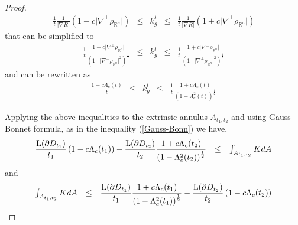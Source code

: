 \documentclass[a4paper]{amsart}
\theoremstyle{definition}
\numberwithin{equation}{section}
\begin{document}
\begin{proof}
\begin{equation}\begin{array}{lllll}
\displaystyle\frac{1}{t}\displaystyle\frac{1}{\vert \nabla R\vert}\left(1-c\vert \nabla^\perp {{\rho_{{\mathbb{R}}^n}}}\vert\right)&\leq & k_g^t&\leq& \displaystyle\frac{1}{t}\displaystyle\frac{1}{\vert \nabla R\vert}\left(1+c\vert \nabla^\perp {{\rho_{{\mathbb{R}}^n}}}\vert \right) \nonumber 
\end{array}
\end{equation}that can be simplified to
\begin{equation}\begin{array}{lllll}
\displaystyle\frac{1}{t}\displaystyle\frac{1-c\vert \nabla^\perp {{\rho_{{\mathbb{R}}^n}}}\vert}{\left(1-\vert \nabla^\perp {{\rho_{{\mathbb{R}}^n}}}\vert^2\right)^{\frac{1}{2}}}&\leq & k_g^t&\leq& \displaystyle\frac{1}{t}\displaystyle\frac{1+c\vert \nabla^\perp {{\rho_{{\mathbb{R}}^n}}}\vert}{\left(1-\vert \nabla^\perp {{\rho_{{\mathbb{R}}^n}}}\vert^2\right)^{\frac{1}{2}}}\nonumber
\end{array}
\end{equation}and can be rewritten as
\begin{equation}\label{eq3.8}
\begin{array}{lllll}
\displaystyle\frac{1-c\Lambda_c(t)}{t}&\leq & k_g^t & \leq &\displaystyle \frac{1}{t}\displaystyle\frac{1+c\Lambda_c(t)}{\left(1-\Lambda^2_c(t)\right)^{\frac{1}{2}}}
\end{array}
\end{equation}

Applying the above inequalities to the extrinsic annulus $A_{t_1,t_2}$ and using Gauss-Bonnet formula, as in the inequality (\ref{Gauss-Bonn}) we have,
\begin{equation}\label{eq3.9}\begin{array}{lll}\displaystyle\frac{{\rm L}(\partial D_{t_1})}{t_1}\displaystyle\left(1-c\Lambda_c(t_1)\right)-\displaystyle\frac{{\rm L}(\partial D_{t_2})}{t_2}\frac{1+c\Lambda_c(t_2)}{\left(1-\Lambda^2_c(t_2)\right)^{\frac{1}{2}}}&\leq & \int_{A_{t_1,t_2}}K dA
\end{array}
\end{equation}
and 
\begin{equation}\label{eq3.10}\begin{array}{lll}
\int_{A_{t_1,t_2}}K dA&\leq& \displaystyle\frac{{\rm L}(\partial D_{t_1})}{t_1}\displaystyle\frac{1+c\Lambda_c(t_1)}{\left(1-\Lambda^2_c(t_1)\right)^{\frac{1}{2}}}-\displaystyle\frac{{\rm L}(\partial D_{t_2})}{t_2}\displaystyle\left(1-c\Lambda_c(t_2)\right)
\end{array}
\end{equation}


\end{proof}
\end{document}
